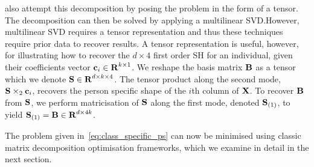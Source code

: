 \citet{minsik2014realtime,minsik2011fast} also attempt this decomposition by
posing the problem in the form of a tensor. The decomposition can then be solved
by applying a multilinear SVD.\@ However, multilinear SVD requires a tensor
representation and thus these techniques require prior data to recover results.
A tensor representation is useful, however, for illustrating how to recover the
$d \times 4$ first order SH for an individual, given their coefficients vector
$\boldsymbol{\mathbf{c}}_i \in \boldsymbol{\mathbf{R}}^{k \times 1}$. We reshape the basis matrix
$\boldsymbol{\mathbf{B}}$ as a tensor which we denote $\boldsymbol{\mathbf{S}} \in \boldsymbol{\mathbf{R}}^{d \times k
\times 4}$. The tensor product along the second mode, $\boldsymbol{\mathbf{S}} \times_2 \boldsymbol{\mathbf{c}}_i$,
recovers the person specific shape of the $i$th column of
$\boldsymbol{\mathbf{X}}$. To recover $\boldsymbol{\mathbf{B}}$ from $\boldsymbol{\mathbf{S}}$, we perform
matricisation of $\boldsymbol{\mathbf{S}}$ along the first mode, denoted $\boldsymbol{\mathbf{S}}_{(1)}$,
to yield $\boldsymbol{\mathbf{S}}_{(1)} = \boldsymbol{\mathbf{B}} \in \boldsymbol{\mathbf{R}}^{d \times 4k}$.

The problem given in~\eqref{eq:class_specific_ps} can now be minimised using
classic matrix decomposition optimisation frameworks, which we examine in
detail in the next section.
